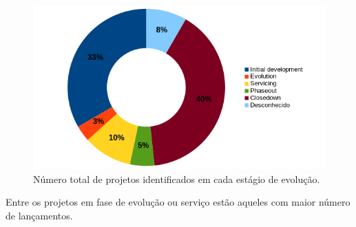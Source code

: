 \begin{figure}[h]
  \begin{minipage}{0.5\textwidth}
    \centering
    \includegraphics[scale=0.55]{imagens/life-cycle-pie.png}
  \end{minipage}
  \begin{minipage}{0.5\textwidth}
    \centering
    
  \end{minipage}
  \caption{Número total de projetos identificados em cada estágio de evolução.}
  \label{life-cycle}
\end{figure}

Entre os projetos em fase de evolução ou serviço estão aqueles com maior número
de lançamentos.

